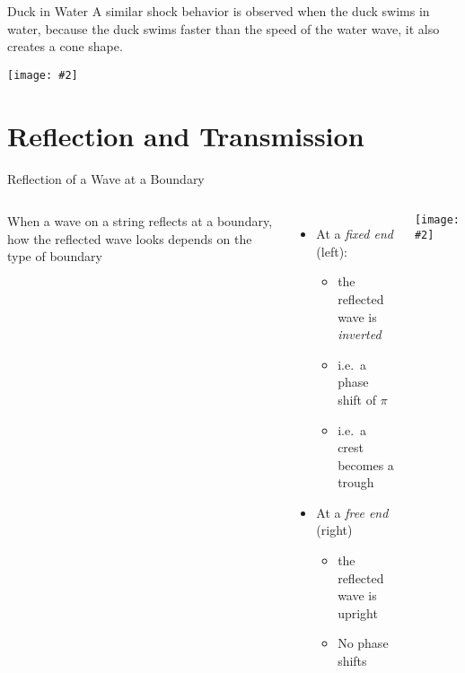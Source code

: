 \documentclass[12pt,aspectratio=169]{beamer}
\newcommand{\pic}[2]{\texttt{[image: \#2]}}
\begin{document}
\begin{frame}{Duck in Water}
  A similar shock behavior is observed when the duck swims in water, because
  the duck swims faster than the speed of the water wave, it also creates a
  cone shape.
  \begin{center}
    \pic{.5}{duck.jpg}
  \end{center}

\end{frame}



\section{Reflection and Transmission}

\begin{frame}{Reflection of a Wave at a Boundary}
  \begin{columns}
    When a wave on a string reflects at a boundary, how the reflected wave looks
    depends on the type of boundary
    \begin{itemize}
    \item At a \emph{fixed end} (left):
      \begin{itemize}
      \item the reflected wave is \emph{inverted}
      \item i.e.\ a phase shift of $\pi$
      \item i.e.\ a crest becomes a trough
      \end{itemize}
    \item At a \emph{free end} (right)
      \begin{itemize}
      \item the reflected wave is upright
      \item No phase shifts
      \end{itemize}
    \end{itemize}
    
    \pic{1}{22.png}
  \end{columns}
\end{frame}
\end{document}
